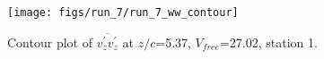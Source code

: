 \begin{figure}[H]
\centering
\texttt{[image: figs/run\_7/run\_7\_ww\_contour]}
\caption{Contour plot of $\overline{v_{z}^{\prime} v_{z}^{\prime}}$ at $z/c$=5.37, $V_{free}$=27.02, station 1.}
\label{fig:run_7_ww_contour}
\end{figure}


